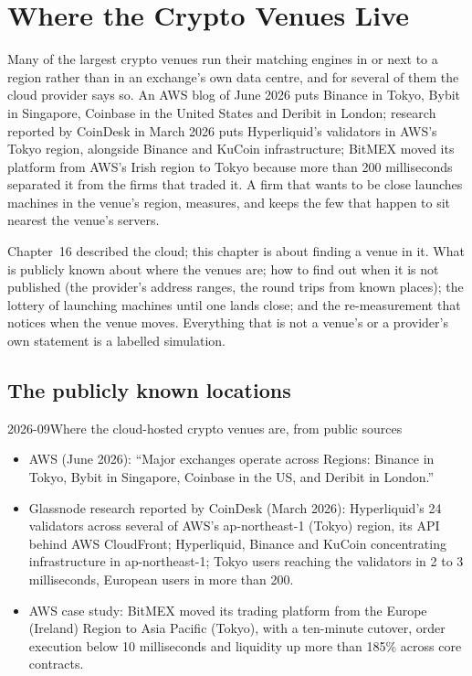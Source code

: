 \chapter{Where the Crypto Venues Live}\label{ch:nw:where-the-crypto-venues-live}

Many of the largest crypto venues run their matching engines in or next to a  region rather than in an exchange's own data
centre, and for several of them the cloud provider says so. An AWS blog of June 2026 puts Binance in Tokyo, Bybit in Singapore, Coinbase in the United States and Deribit in London;
research reported by CoinDesk in March 2026 puts Hyperliquid's validators in AWS's Tokyo region, alongside Binance and KuCoin infrastructure;
BitMEX moved its platform from AWS's Irish region to Tokyo because more than 200 milliseconds separated it from the firms that traded it. A
firm that wants to be close launches machines in the venue's region, measures, and keeps the few that happen to sit nearest the venue's
servers.

Chapter~16 described the cloud; this chapter is about finding a venue in it. What is publicly known about where the venues are; how to find
out when it is not published (the provider's address ranges, the round trips from known places); the lottery of launching machines until one
lands close; and the re-measurement that notices when the venue moves. Everything that is not a venue's or a provider's own statement is a
labelled simulation.

\section{The publicly known locations}

\begin{dated}{2026-09}{Where the cloud-hosted crypto venues are, from public sources}\label{dat:nw:where-the-crypto-venues-live:venues}
\begin{itemize}
\item AWS (June 2026): ``Major exchanges operate across Regions: Binance in Tokyo, Bybit in Singapore, Coinbase in the US, and Deribit in London.''
\item Glassnode research reported by CoinDesk (March 2026): Hyperliquid's 24 validators across several  of AWS's
  ap-northeast-1 (Tokyo) region, its API behind AWS CloudFront; Hyperliquid, Binance and KuCoin concentrating infrastructure in ap-northeast-1;
  Tokyo users reaching the validators in 2 to 3 milliseconds, European users in more than 200.
\item AWS case study: BitMEX moved its trading platform from the Europe (Ireland) Region to Asia Pacific (Tokyo), with a ten-minute cutover,
  order execution below 10 milliseconds and liquidity up more than 185\% across core contracts.
\end{itemize}
\end{dated}

